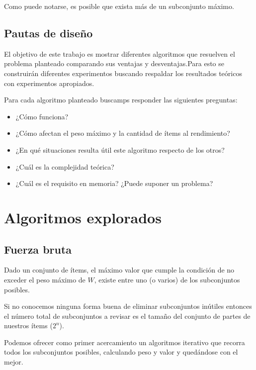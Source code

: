 \documentclass[fleqn, 11pt]{article}
\begin{document}
Como puede notarse, es posible que exista más de un subconjunto máximo.

\subsection{Pautas de diseño}

El objetivo de este trabajo es mostrar diferentes algoritmos que resuelven el
problema planteado comparando sus ventajas y desventajas.Para esto se
construirán diferentes experimentos buscando respaldar los resultados teóricos
con experimentos apropiados.

Para cada algoritmo planteado buscamps responder las siguientes preguntas:

\begin{itemize}
\item[] ¿Cómo funciona?
\item[] ¿Cómo afectan el peso máximo y la cantidad de ítems al rendimiento?
\item[] ¿En qué situaciones resulta útil este algoritmo respecto de los otros?
\item[] ¿Cuál es la complejidad teórica?
\item[] ¿Cuál es el requisito en memoria? ¿Puede suponer un problema?
\end{itemize}

\section{Algoritmos explorados}

\subsection{Fuerza bruta}

Dado un conjunto de ítems, el máximo valor que cumple la condición de no
exceder el peso máximo de $W$, existe entre uno (o varios) de los subconjuntos
posibles.

Si no conocemos ninguna forma buena de eliminar subconjuntos inútiles entonces
el número total de subconjuntos a revisar es el tamaño del conjunto de partes
de nuestros ítems ($2^n$).

Podemos ofrecer como primer acercamiento un algoritmos iterativo que recorra todos los
subconjuntos posibles, calculando peso y valor y quedándose con el mejor.
\end{document}
